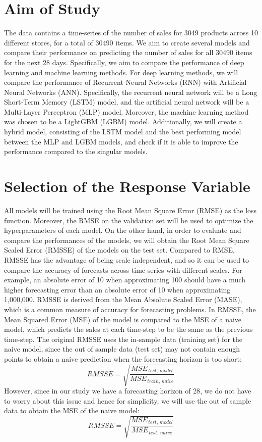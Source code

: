 \section{Aim of Study}
The data contains a time-series of the number of sales for 3049 products across 10 different stores, for a total of 30490 items. 
We aim to create several models and compare their performance on predicting the number of sales for all 30490 items for the next 28 days. 
Specifically, we aim to compare the performance of deep learning and machine learning methods.
For deep learning methods, we will compare the performance of Recurrent Neural Networks (RNN) with Artificial Neural Networks (ANN). 
Specifically, the recurrent neural network will be a Long Short-Term Memory (LSTM) model, and the artificial neural network will be a Multi-Layer Perceptron (MLP) model.
Moreover, the machine learning method was chosen to be a LightGBM (LGBM) model. 
Additionally, we will create a hybrid model, consisting of the LSTM model and the best performing model between the MLP and LGBM models, and check if it is able to improve the performance compared to the singular models.


\section{Selection of the Response Variable}
All models will be trained using the Root Mean Square Error (RMSE) as the loss function.
Moreover, the RMSE on the validation set will be used to optimize the hyperparameters of each model.
On the other hand, in order to evaluate and compare the performances of the models, we will obtain the Root Mean Square Scaled Error (RMSSE) of the models on the test set.
Compared to RMSE, RMSSE has the advantage of being scale independent, and so it can be used to compare the accuracy of forecasts across time-series with different scales.
For example, an absolute error of 10 when approximating 100 should have a much higher forecasting error than an absolute error of 10 when approximating 1,000,000.
RMSSE is derived from the Mean Absolute Scaled Error (MASE), which is a common measure of accuracy for forecasting problems.
In RMSSE, the Mean Squared Error (MSE) of the model is compared to the MSE of a naive model, which predicts the sales at each time-step to be the same as the previous time-step.
The original RMSSE uses the in-sample data (training set) for the naive model, since the out of sample data (test set) may not contain enough points to obtain a naive prediction when the forecasting horizon is too short: \cite{yardstick, m5}
\[RMSSE = \sqrt{\frac{MSE_{\,test, \,model}}{MSE_{\,train, \,naive}}}\]
However, since in our study we have a forecasting horizon of 28, we do not have to worry about this issue and hence for simplicity, we will use the out of sample data to obtain the MSE of the naive model:
\[RMSSE = \sqrt{\frac{MSE_{\,test, \,model}}{MSE_{\,test, \,naive}}}\]

